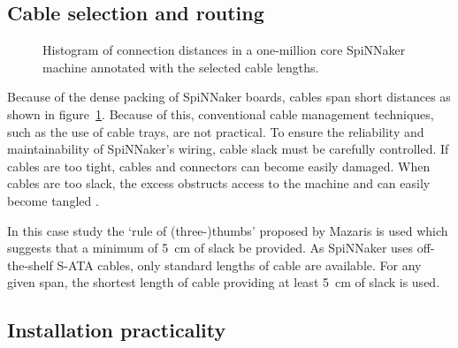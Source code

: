 		\subsection{Cable selection and routing}
			
			\begin{figure}
				
				\center
				
				\caption{Histogram of connection distances in a one-million core
				SpiNNaker machine annotated with the selected cable lengths.}
				\label{fig:wire-length-histogram}
				
			\end{figure}
			
			Because of the dense packing of SpiNNaker boards, cables span short
			distances as shown in figure~\ref{fig:wire-length-histogram}.  Because of
			this, conventional cable management techniques, such as the use of cable
			trays, are not practical. To ensure the reliability and maintainability
			of SpiNNaker's wiring, cable slack must be carefully controlled.  If
			cables are too tight, cables and connectors can become easily damaged.
			When cables are too slack, the excess obstructs access to the machine and
			can easily become tangled \cite{cisco07}.
			
			In this case study the `rule of (three-)thumbs' proposed by Mazaris
			\cite{mazaris97} is used which suggests that a minimum of
			\SI{5}{\centi\meter} of slack be provided. As SpiNNaker uses
			off-the-shelf S-ATA cables, only standard lengths of cable are available.
			For any given span, the shortest length of cable providing at least
			\SI{5}{\centi\meter} of slack is used.
		
		\subsection{Installation practicality}
			
